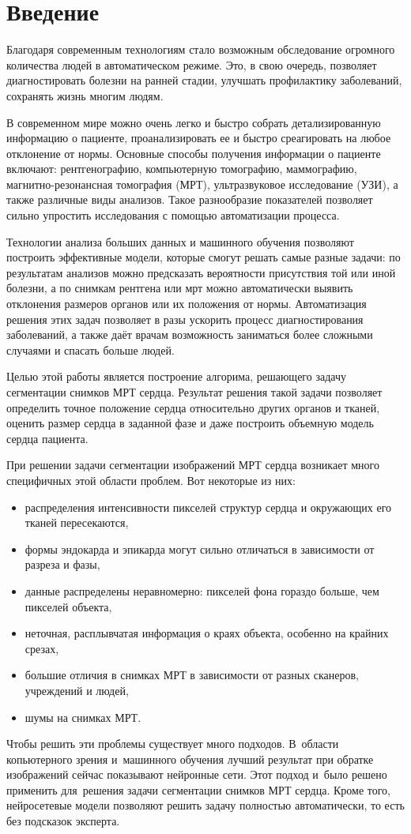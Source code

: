 \section{Введение}

Благодаря современным технологиям стало возможным обследование огромного количества людей в автоматическом режиме. Это, в свою очередь, позволяет диагностировать болезни на ранней стадии, улучшать профилактику заболеваний, сохранять жизнь многим людям.

В современном мире можно очень легко и быстро собрать детализированную информацию о пациенте, проанализировать ее и быстро среагировать на любое отклонение от нормы. Основные способы получения информации о пациенте включают: рентгенографию, компьютерную томографию, маммографию, магнитно-резонансная томография (МРТ), ультразвуковое исследование (УЗИ), а также различные виды анализов. Такое разнообразие показателей позволяет сильно упростить исследования с помощью автоматизации процесса.

Технологии анализа больших данных и машинного обучения позволяют построить эффективные модели, которые смогут решать самые разные задачи: по результатам анализов можно предсказать вероятности присутствия той или иной болезни, а по снимкам рентгена или мрт можно автоматически выявить отклонения размеров органов или их положения от нормы. Автоматизация решения этих задач позволяет в разы ускорить процесс диагностирования заболеваний, а также даёт врачам возможность заниматься более сложными случаями и спасать больше людей.

Целью этой работы является построение алгорима, решающего задачу сегментации снимков МРТ сердца. Результат решения такой задачи позволяет определить точное положение сердца относительно других органов и тканей, оценить размер сердца в заданной фазе и даже построить объемную модель сердца пациента.

При решении задачи сегментации изображений МРТ сердца возникает много специфичных этой области проблем. Вот некоторые из них:

\begin{itemize}
  \item распределения интенсивности пикселей структур сердца и окружающих его тканей пересекаются,
  \item формы эндокарда и эпикарда могут сильно отличаться в зависимости от разреза и фазы,
  \item данные распределены неравномерно: пикселей фона гораздо больше, чем пикселей объекта,
  \item неточная, расплывчатая информация о краях объекта, особенно на крайних срезах,
  \item большие отличия в снимках МРТ в зависимости от разных сканеров, учреждений и людей,
  \item шумы на снимках МРТ.
\end{itemize}

Чтобы решить эти проблемы существует много подходов. В~области копьютерного зрения и~машинного обучения лучший результат при обратке изображений сейчас показывают нейронные сети. Этот подход и~было решено применить для~решения задачи сегментации снимков МРТ сердца. Кроме того, нейросетевые модели позволяют решить задачу полностью автоматически, то есть без подсказок эксперта.
